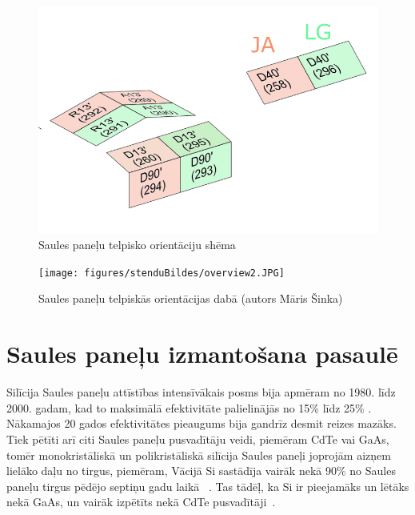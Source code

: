 \begin{figure}[h]
    \centering
    \includegraphics[width=0.7\linewidth]{figures/misc/uzstadijumaShema.jpg}
    \caption{Saules paneļu telpisko orientāciju shēma}
    \label{fig:paneli}
\end{figure}

\begin{figure}[h]
    \centering
    \texttt{[image: figures/stenduBildes/overview2.JPG]}
    \caption{Saules paneļu telpiskās orientācijas dabā (autors Māris Šinka)}
    \label{fig:paneli}
\end{figure}

\section{Saules paneļu izmantošana pasaulē}

Silīcija Saules paneļu attīstības intensīvākais posms bija apmēram no 1980. līdz 2000. gadam, kad to maksimālā efektivitāte palielinājās no 15\% līdz 25\%
\cite{Sivaram}. Nākamajos 20 gados efektivitātes pieaugums bija gandrīz desmit reizes mazāks. Tiek pētīti arī citi Saules paneļu pusvadītāju veidi, piemēram CdTe vai GaAs, tomēr monokristāliskā un polikristāliskā silīcija Saules paneļi joprojām aizņem lielāko daļu no tirgus, piemēram, Vācijā Si sastādīja vairāk nekā 90\% no Saules paneļu tirgus pēdējo septiņu gadu laikā ~\cite{prognoze}. Tas tādēļ, ka Si ir pieejamāks un lētāks nekā GaAs\cite{hayes_clemens_2015}, un vairāk izpētīts nekā CdTe pusvadītāji~\cite{Sivaram}.

